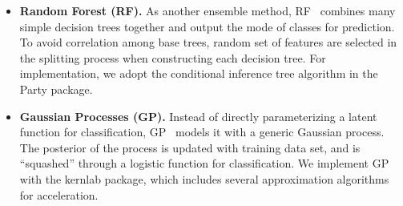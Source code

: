\begin{itemize}
  \item
  \textbf{Random Forest (RF).}
  As another ensemble method, RF~\cite{bib:liaw2002classification} combines many simple decision trees together and output the mode of classes for prediction.
  To avoid correlation among base trees, random set of features are selected in the splitting process when constructing each decision tree.
  For implementation, we adopt the conditional inference tree algorithm in the Party package.
  \item
  \textbf{Gaussian Processes (GP).}
  Instead of directly parameterizing a latent function for classification, GP~\cite{bib:rasmussen2006gaussian} models it with a generic Gaussian process.
  The posterior of the process is updated with training data set, and is ``squashed'' through a logistic function for classification.
  We implement GP with the kernlab package, which includes several approximation algorithms for acceleration.
\end{itemize}


